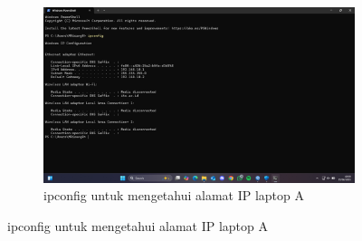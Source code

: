 \begin{enumerate}
	\begin{figure}[H]
		\centering
		\begin{subfigure}[b]{0.4\linewidth}
			\includegraphics[width=\linewidth]{P5/img/ipconfig laptop.png}
			\caption{ipconfig untuk mengetahui alamat IP laptop A\label{fig:konfigurasiR1}}
		\end{subfigure}
	\end{figure}
\end{enumerate}
